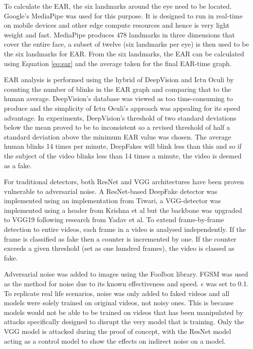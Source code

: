 To calculate the EAR, the six landmarks around the eye need to be located. Google's MediaPipe\cite{lugaresi2019mediapipe} was used for this purpose. It is designed to run in real-time on mobile devices and other edge compute resources and hence is very light weight and fast. MediaPipe produces 478 landmarks in three dimensions that cover the entire face, a subset of twelve (six landmarks per eye) is then used to be the six landmarks for EAR. From the six landmarks, the EAR can be calculated using Equation \ref{eq:ear} and the average taken for the final EAR-time graph. 

EAR analysis is performed using the hybrid of DeepVision\cite{jung2020deepvision} and Ictu Oculi\cite{li2018ictu} by counting the number of blinks in the EAR graph and comparing that to the human average. DeepVision's database was viewed as too time-consuming to produce and the simplicity of Ictu Oculi's approach was appealing for its speed advantage. In experiments, DeepVision's threshold of two standard deviations below the mean proved to be to inconsistent so a revised threshold of half a standard deviation above the minimum EAR value was chosen. The average human blinks 14 times per minute\cite{schiffman1990sensation}, DeepFakes will blink less than this and so if the subject of the video blinks less than 14 times a minute, the video is deemed as a fake.

For traditional detectors, both ResNet and VGG architectures have been proven vulnerable to adversarial noise\cite{gandhi2020adversarial}. A ResNet-based DeepFake detector was implemented using an implementation from Tiwari\cite{tiwari2024deepfake}, a VGG-detector was implemented using a header from Krishna et al\cite{krishna2022deepfake} but the backbone was upgraded to VGG19 following research from Yadav et al\cite{yadav2024deepfake}. To extend frame-by-frame detection to entire videos, each frame in a video is analysed independently. If the frame is classified as fake then a counter is incremented by one. If the counter exceeds a given threshold (set as one hundred frames), the video is classed as fake.

Adversarial noise was added to images using the Foolbox library\cite{rauber2017foolbox}\cite{rauber2017foolboxnative}. FGSM was used as the method for noise due to its known effectiveness and speed\cite{gandhi2020adversarial}. $\epsilon$ was set to 0.1. To replicate real life scenarios, noise was only added to faked videos and all models were solely trained on original videos, not noisy ones. This is because models would not be able to be trained on videos that has been manipulated by attacks specifically designed to disrupt the very model that is training. Only the VGG model is attacked during the proof of concept, with the ResNet model acting as a control model to show the effects on indirect noise on a model.

